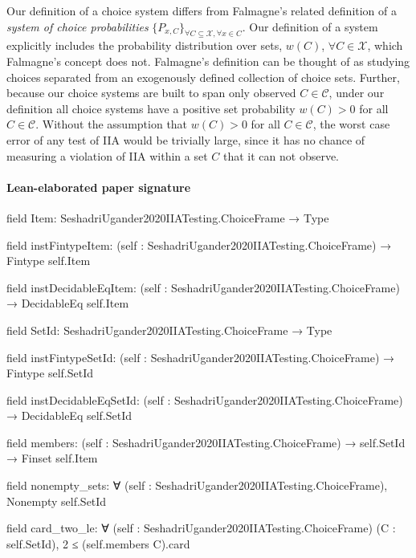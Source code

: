 \documentclass[10pt]{article}
\begin{document}
\begin{ReviewVerbatim}
	Our definition of a choice system differs from Falmagne's \cite{falmagne1978representation,barbera1986falmagne} related definition of a {\it system of choice probabilities} $\{P_{x,C}\}_{\forall C \subseteq \mathcal X, \forall x \in C}$. Our definition of a system explicitly includes the probability distribution over sets, $w(C)$, $\forall C \in \mathcal X$, which Falmagne's concept does not. Falmagne's definition can be thought of as studying choices separated from an exogenously defined collection of choice sets. Further, because our choice systems are built to span only observed $C \in \mathcal{C}$, under our definition all choice systems have a positive set probability $w(C)>0$ for all $C \in \mathcal{C}$. Without the assumption that $w(C)>0$ for all $C \in \mathcal{C}$, the worst case error of any test of IIA would be trivially large, since it has no chance of measuring a violation of IIA within a set $C$ that it can not observe.
\end{ReviewVerbatim}



\paragraph{Lean-elaborated paper signature}
\begin{ReviewVerbatim}
field Item:
SeshadriUgander2020IIATesting.ChoiceFrame → Type

field instFintypeItem:
(self : SeshadriUgander2020IIATesting.ChoiceFrame) → Fintype self.Item

field instDecidableEqItem:
(self : SeshadriUgander2020IIATesting.ChoiceFrame) → DecidableEq self.Item

field SetId:
SeshadriUgander2020IIATesting.ChoiceFrame → Type

field instFintypeSetId:
(self : SeshadriUgander2020IIATesting.ChoiceFrame) → Fintype self.SetId

field instDecidableEqSetId:
(self : SeshadriUgander2020IIATesting.ChoiceFrame) → DecidableEq self.SetId

field members:
(self : SeshadriUgander2020IIATesting.ChoiceFrame) → self.SetId → Finset self.Item

field nonempty_sets:
∀ (self : SeshadriUgander2020IIATesting.ChoiceFrame), Nonempty self.SetId

field card_two_le:
∀ (self : SeshadriUgander2020IIATesting.ChoiceFrame) (C : self.SetId), 2 ≤ (self.members C).card
\end{ReviewVerbatim}
\end{document}
